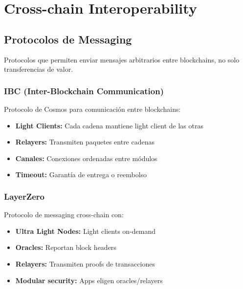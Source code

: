 \documentclass[11pt,a4paper,twoside]{book}
\begin{document}
\section{Cross-chain Interoperability}
\label{sec:crosschain}

\subsection{Protocolos de Messaging}

\begin{definition}
Protocolos que permiten enviar mensajes arbitrarios entre blockchains, no solo transferencias de valor.
\end{definition}

\subsubsection{IBC (Inter-Blockchain Communication)}

\begin{definition}[IBC]
Protocolo de Cosmos para comunicaci\'on entre blockchains:
\begin{itemize}
    \item \textbf{Light Clients:} Cada cadena mantiene light client de las otras
    \item \textbf{Relayers:} Transmiten paquetes entre cadenas
    \item \textbf{Canales:} Conexiones ordenadas entre m\'odulos
    \item \textbf{Timeout:} Garant\'ia de entrega o reembolso
\end{itemize}
\end{definition}

\subsubsection{LayerZero}

\begin{definition}[LayerZero]
Protocolo de messaging cross-chain con:
\begin{itemize}
    \item \textbf{Ultra Light Nodes:} Light clients on-demand
    \item \textbf{Oracles:} Reportan block headers
    \item \textbf{Relayers:} Transmiten proofs de transacciones
    \item \textbf{Modular security:} Apps eligen oracles/relayers
\end{itemize}
\end{definition}
\end{document}
